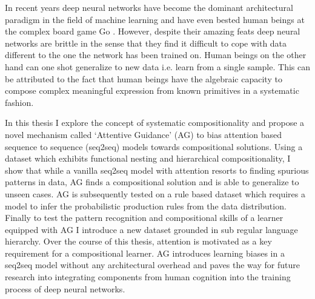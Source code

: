 	In recent years deep neural networks have become the dominant architectural paradigm in the field of machine learning and have even bested human beings at the complex board game Go \citep{Silver2016}. However, despite their amazing feats deep neural networks are brittle in the sense that they find it difficult to cope with data different to the one the network has been trained on. Human beings on the other hand can one shot generalize to new data i.e. learn from a single sample. This can be attributed to the fact that human beings have the algebraic capacity \citep{marcus2003algebraic} to compose complex meaningful expression from known primitives in a systematic fashion.
	
	In this thesis I explore the concept of systematic compositionality and propose a novel mechanism called \lq Attentive Guidance\rq{} (AG) to bias attention based sequence to sequence (seq2seq) models towards compositional solutions. Using a dataset which exhibits functional nesting and hierarchical compositionality, I show that while a vanilla seq2seq model with attention resorts to finding spurious patterns in data, AG finds a compositional solution and is able to generalize to unseen cases. AG is subsequently tested on a rule based dataset which requires a model to infer the probabilistic production rules from the data distribution. Finally to test the pattern recognition and compositional skills of a learner equipped with AG I introduce a new dataset grounded in sub regular language hierarchy. Over the course of this thesis, attention is motivated as a key requirement for a compositional learner. AG introduces learning biases in a seq2seq model without any architectural overhead and paves the way for future research into integrating components from human cognition into the training process of deep neural networks.



